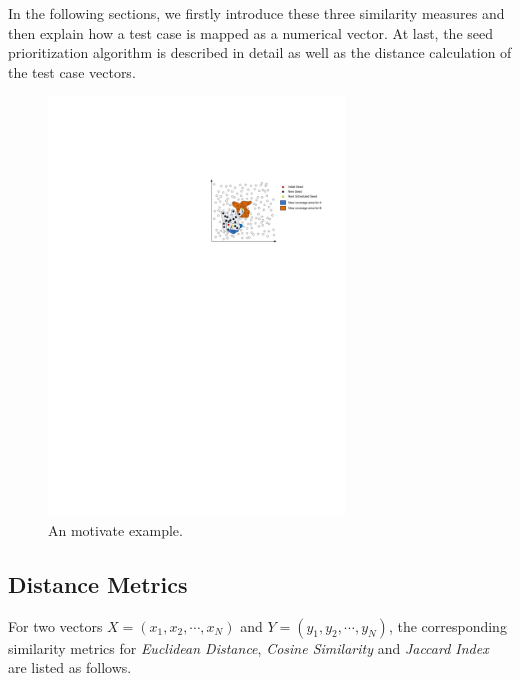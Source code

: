 In the following sections, we firstly introduce these three similarity measures and then explain how a test case is mapped as a numerical vector. At last, the seed prioritization algorithm is described in detail as well as the distance calculation of the test case vectors.

\begin{figure}
\centering
\includegraphics[width=0.7\textwidth]{figures/motivate-example.pdf} 
\caption{An motivate example.}\label{motivate-example}
\end{figure}

\subsection{Distance Metrics}
For two vectors $\mathit{X} = (x_1, x_2, \cdots, x_N)$ and $\mathit{Y} = (y_1, y_2, \cdots, y_N)$, the corresponding similarity metrics for \textit{Euclidean Distance}, \textit{Cosine Similarity} and \textit{Jaccard Index} are listed as follows.

